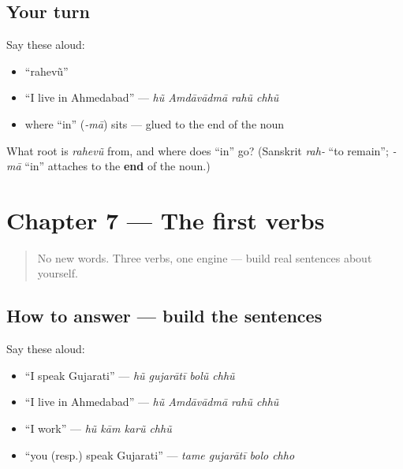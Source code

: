 \subsection*{Your turn}
Say these aloud:

\begin{itemize}
\raggedright
  \item \textquotedblleft{}rahevũ\textquotedblright{}
  \item \textquotedblleft{}I live in Ahmedabad\textquotedblright{} — \emph{hũ Amdāvādmā rahũ chhũ}
  \item where \textquotedblleft{}in\textquotedblright{} (\emph{-mā}) sits — glued to the end of the noun
\end{itemize}

\begin{tcolorbox}[breakable,colback=teal!4,colframe=teal!35!black,title={Before you move on}]
What root is \emph{rahevũ} from, and where does \textquotedblleft{}in\textquotedblright{} go? (Sanskrit \emph{rah-} \textquotedblleft{}to remain\textquotedblright{}; \emph{-mā} \textquotedblleft{}in\textquotedblright{} attaches to the \textbf{end} of the noun.)
\end{tcolorbox}
\section[Practice]{Chapter 7 — The first verbs}

\label{lesson:GU-C05-practice}



\begin{quote}
No new words. Three verbs, one engine — build real sentences about yourself.
\end{quote}

\subsection*{How to answer — build the sentences}
Say these aloud:

\begin{itemize}
\raggedright
  \item \textquotedblleft{}I speak Gujarati\textquotedblright{} — \emph{hũ gujarātī bolũ chhũ}
  \item \textquotedblleft{}I live in Ahmedabad\textquotedblright{} — \emph{hũ Amdāvādmā rahũ chhũ}
  \item \textquotedblleft{}I work\textquotedblright{} — \emph{hũ kām karũ chhũ}
  \item \textquotedblleft{}you (resp.) speak Gujarati\textquotedblright{} — \emph{tame gujarātī bolo chho}
\end{itemize}

